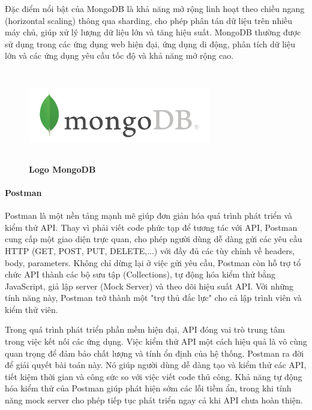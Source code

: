 Đặc điểm nổi bật của MongoDB là khả năng mở rộng linh hoạt theo chiều ngang (horizontal scaling) thông qua sharding, cho phép phân tán dữ liệu trên nhiều máy chủ, giúp xử lý lượng dữ liệu lớn và tăng hiệu suất. MongoDB thường được sử dụng trong các ứng dụng web hiện đại, ứng dụng di động, phân tích dữ liệu lớn và các ứng dụng yêu cầu tốc độ và khả năng mở rộng cao.

\begin{figure}[H]
	\centering
	\includegraphics[width=8cm,height=4cm]{Images/Technology/mongo.png}
	\caption[Logo MongoDB]{\bfseries \fontsize{12pt}{0pt}
		\selectfont Logo MongoDB}
	\label{mongodb} %
\end{figure}

\paragraph{Postman}
\mbox{}

Postman là một nền tảng mạnh mẽ giúp đơn giản hóa quá trình phát triển và kiểm thử API. Thay vì phải viết code phức tạp để tương tác với API, Postman cung cấp một giao diện trực quan, cho phép người dùng dễ dàng gửi các yêu cầu HTTP (GET, POST, PUT, DELETE,...) với đầy đủ các tùy chỉnh về headers, body, parameters. Không chỉ dừng lại ở việc gửi yêu cầu, Postman còn hỗ trợ tổ chức API thành các bộ sưu tập (Collections), tự động hóa kiểm thử bằng JavaScript, giả lập server (Mock Server) và theo dõi hiệu suất API. Với những tính năng này, Postman trở thành một "trợ thủ đắc lực" cho cả lập trình viên và kiểm thử viên.

Trong quá trình phát triển phần mềm hiện đại, API đóng vai trò trung tâm trong việc kết nối các ứng dụng. Việc kiểm thử API một cách hiệu quả là vô cùng quan trọng để đảm bảo chất lượng và tính ổn định của hệ thống. Postman ra đời để giải quyết bài toán này. Nó giúp người dùng dễ dàng tạo và kiểm thử các API, tiết kiệm thời gian và công sức so với việc viết code thủ công. Khả năng tự động hóa kiểm thử của Postman giúp phát hiện sớm các lỗi tiềm ẩn, trong khi tính năng mock server cho phép tiếp tục phát triển ngay cả khi API chưa hoàn thiện.

